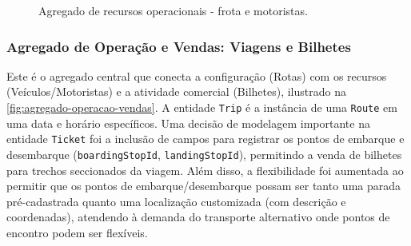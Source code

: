 \begin{figure}[H]
  \caption{Agregado de recursos operacionais - frota e motoristas.}
  \label{fig:agregado-recursos-operacionais}
\end{figure}

\subsubsection*{Agregado de Operação e Vendas: Viagens e Bilhetes}

Este é o agregado central que conecta a configuração (Rotas) com os recursos (Veículos/Motoristas) e a atividade comercial (Bilhetes), ilustrado na \autoref{fig:agregado-operacao-vendas}. A entidade \texttt{Trip} é a instância de uma \texttt{Route} em uma data e horário específicos. Uma decisão de modelagem importante na entidade \texttt{Ticket} foi a inclusão de campos para registrar os pontos de embarque e desembarque (\texttt{boardingStopId}, \texttt{landingStopId}), permitindo a venda de bilhetes para trechos seccionados da viagem. Além disso, a flexibilidade foi aumentada ao permitir que os pontos de embarque/desembarque possam ser tanto uma parada pré-cadastrada quanto uma localização customizada (com descrição e coordenadas), atendendo à demanda do transporte alternativo onde pontos de encontro podem ser flexíveis.

